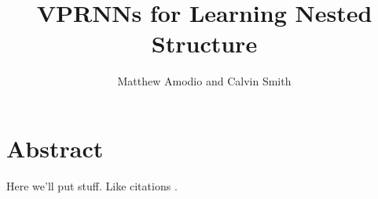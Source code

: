 \documentclass{article}
\title{VPRNNs for Learning Nested Structure}
\author{Matthew Amodio and Calvin Smith}
\begin{document}
\maketitle

\section{Abstract}
Here we'll put stuff. Like citations \cite{Goller95}.



\end{document}
